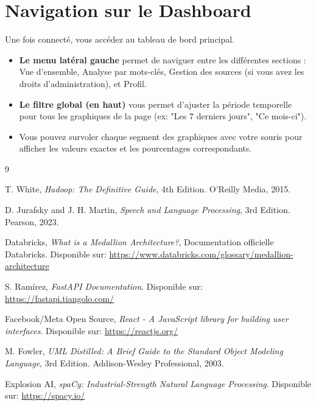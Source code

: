 \documentclass[12pt,a4paper,oneside]{report}
\begin{document}
\section{Navigation sur le Dashboard}
Une fois connecté, vous accédez au tableau de bord principal. 
\begin{itemize}
    \item \textbf{Le menu latéral gauche} permet de naviguer entre les différentes sections : Vue d'ensemble, Analyse par mots-clés, Gestion des sources (si vous avez les droits d'administration), et Profil.
    \item \textbf{Le filtre global (en haut)} vous permet d'ajuster la période temporelle pour tous les graphiques de la page (ex: "Les 7 derniers jours", "Ce mois-ci").
    \item Vous pouvez survoler chaque segment des graphiques avec votre souris pour afficher les valeurs exactes et les pourcentages correspondants.
\end{itemize}

\newpage

\begin{thebibliography}{9}

T. White, \textit{Hadoop: The Definitive Guide}, 4th Edition. O'Reilly Media, 2015.

D. Jurafsky and J. H. Martin, \textit{Speech and Language Processing}, 3rd Edition. Pearson, 2023.

Databricks, \textit{What is a Medallion Architecture?}, Documentation officielle Databricks. Disponible sur: \url{https://www.databricks.com/glossary/medallion-architecture}

S. Ramírez, \textit{FastAPI Documentation}. Disponible sur: \url{https://fastapi.tiangolo.com/}

Facebook/Meta Open Source, \textit{React - A JavaScript library for building user interfaces}. Disponible sur: \url{https://reactjs.org/}

M. Fowler, \textit{UML Distilled: A Brief Guide to the Standard Object Modeling Language}, 3rd Edition. Addison-Wesley Professional, 2003.

Explosion AI, \textit{spaCy: Industrial-Strength Natural Language Processing}. Disponible sur: \url{https://spacy.io/}

\end{thebibliography}
\end{document}
